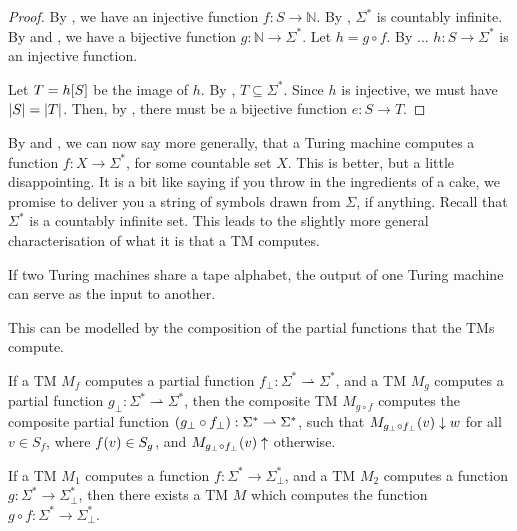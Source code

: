 
\begin{proof} By , we have an injective function $f : S
\rightarrow \mathbb{N}$. By , $\Sigma^*$
is countably infinite. By  and ,
we have a bijective function $g:\mathbb{N}\rightarrow\Sigma^*$. Let $h = g\circ
f$. By ... $h : S\rightarrow \Sigma^*$ is an injective function. 

Let $T=h\mathopen{}\left[{S}\right]\mathclose{}$ be the image of $h$. By , $T \subseteq
\Sigma^*$. Since $h$ is injective, we must have $\mathopen{}\left|{S}\right|\mathclose{}=\mathopen{}\left|{T}\right|\mathclose{}$. Then, by
, there must be a bijective function $e : S \rightarrow
T$.\end{proof}

By  and , we can now
say more generally, that a Turing machine computes a function $f:X\rightarrow
\Sigma^*$, for some countable set $X$. This is better, but a little
disappointing. It is a bit like saying if you throw in the ingredients of a
cake, we promise to deliver you a string of symbols drawn from $\Sigma$, if
anything. Recall that $\Sigma^*$ is a countably infinite set. This leads to the
slightly more general characterisation of what it is that a TM computes.

If two Turing machines share a tape alphabet, the output of one Turing machine
can serve as the input to another.

This can be modelled by the composition of the
partial functions that the TMs compute.

\begin{definition} If a TM $M_f$ computes a partial function $f_\bot : \Sigma^*
\rightharpoonup \Sigma^*$, and a TM $M_g$ computes a partial function $g_\bot :
\Sigma^* \rightharpoonup \Sigma^*$, then the composite TM $M_{g\circ f}$
computes the composite partial function $\mathopen{}\left({g_\bot \circ f_\bot}\right)\mathclose{} : \Sigma^*
\rightharpoonup \Sigma^*$, such that $M_{g_\bot \circ f_\bot}\mathopen{}\left({v}\right)\mathclose{}\downarrow w$
for all $v\in S_f$, where $f\mathopen{}\left({v}\right)\mathclose{}\in S_g$, and $M_{g_\bot \circ
f_\bot}\mathopen{}\left({v}\right)\mathclose{}\uparrow$ otherwise. \end{definition}

\begin{theorem} If a TM $M_1$ computes a function $f : \Sigma^* \rightarrow
\Sigma^*_\bot$, and a TM $M_2$ computes a function $g : \Sigma^* \rightarrow
\Sigma^*_\bot$, then there exists a TM $M$ which computes the function $g\circ
f : \Sigma^* \rightarrow \Sigma^*_\bot$.\end{theorem}

